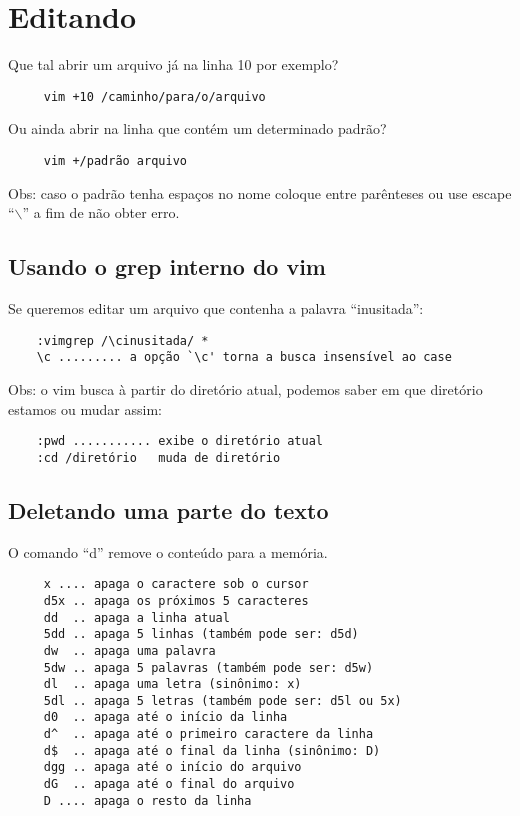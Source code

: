 
\chapter{Editando}
\label{Editando}

Que tal abrir um arquivo já na linha 10 por exemplo?

\begin{verbatim}
     vim +10 /caminho/para/o/arquivo
\end{verbatim}

Ou ainda abrir na linha que contém um determinado padrão?

\begin{verbatim}
     vim +/padrão arquivo
\end{verbatim}

Obs: caso o padrão tenha espaços no nome coloque entre parênteses ou
use escape ``$\backslash$'' a fim de não obter erro.

\section{Usando o grep interno do vim}
\label{sec:Usando o grep interno do vim}

Se queremos editar um arquivo que contenha a palavra ``inusitada'':

\begin{verbatim}
    :vimgrep /\cinusitada/ *
    \c ......... a opção `\c' torna a busca insensível ao case
\end{verbatim}

Obs: o vim busca à partir do diretório atual, podemos saber 
em que diretório estamos ou mudar assim:

\begin{verbatim}
    :pwd ........... exibe o diretório atual
    :cd /diretório   muda de diretório
\end{verbatim}

\section{Deletando uma parte do texto}\label{Deletando uma parte do texto}

O comando ``d'' remove o conteúdo para a memória.

\begin{verbatim}
     x .... apaga o caractere sob o cursor
     d5x .. apaga os próximos 5 caracteres
     dd  .. apaga a linha atual
     5dd .. apaga 5 linhas (também pode ser: d5d)
     dw  .. apaga uma palavra
     5dw .. apaga 5 palavras (também pode ser: d5w)
     dl  .. apaga uma letra (sinônimo: x)
     5dl .. apaga 5 letras (também pode ser: d5l ou 5x)
     d0  .. apaga até o início da linha
     d^  .. apaga até o primeiro caractere da linha
     d$  .. apaga até o final da linha (sinônimo: D)
     dgg .. apaga até o início do arquivo
     dG  .. apaga até o final do arquivo
     D .... apaga o resto da linha
\end{verbatim}

